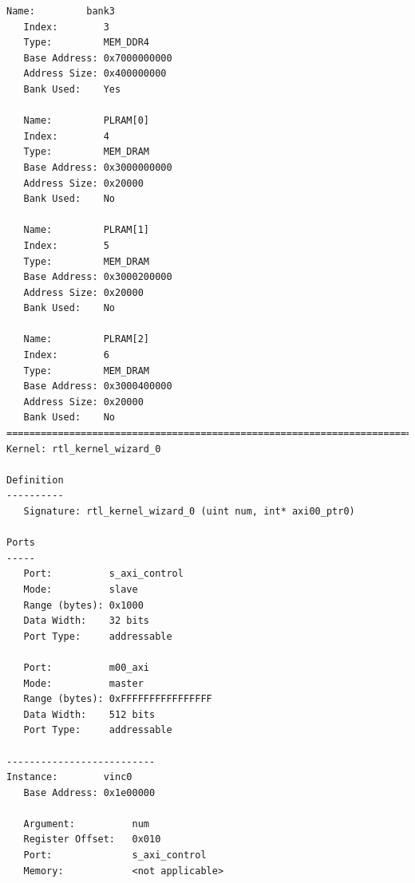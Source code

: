 \begin{lstlisting}[label=code, basicstyle=\tiny, caption=Листинг файла vinc.xclbin.info]
   Name:         bank3
   Index:        3
   Type:         MEM_DDR4
   Base Address: 0x7000000000
   Address Size: 0x400000000
   Bank Used:    Yes

   Name:         PLRAM[0]
   Index:        4
   Type:         MEM_DRAM
   Base Address: 0x3000000000
   Address Size: 0x20000
   Bank Used:    No

   Name:         PLRAM[1]
   Index:        5
   Type:         MEM_DRAM
   Base Address: 0x3000200000
   Address Size: 0x20000
   Bank Used:    No

   Name:         PLRAM[2]
   Index:        6
   Type:         MEM_DRAM
   Base Address: 0x3000400000
   Address Size: 0x20000
   Bank Used:    No
==============================================================================
Kernel: rtl_kernel_wizard_0

Definition
----------
   Signature: rtl_kernel_wizard_0 (uint num, int* axi00_ptr0)

Ports
-----
   Port:          s_axi_control
   Mode:          slave
   Range (bytes): 0x1000
   Data Width:    32 bits
   Port Type:     addressable

   Port:          m00_axi
   Mode:          master
   Range (bytes): 0xFFFFFFFFFFFFFFFF
   Data Width:    512 bits
   Port Type:     addressable

--------------------------
Instance:        vinc0
   Base Address: 0x1e00000

   Argument:          num
   Register Offset:   0x010
   Port:              s_axi_control
   Memory:            <not applicable>


\end{lstlisting}
